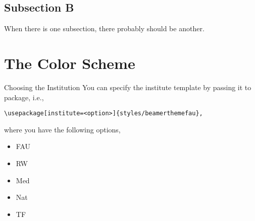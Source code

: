 \subsection{Subsection B}
\begin{frame}{\mbox{}}
When there is one subsection, there probably should be another.
\end{frame}
%
%
%
%
%
\section{The Color Scheme}
%
%
%
%
%
\begin{frame}[fragile]{Choosing the Institution}
You can specify the institute template by passing it to package, i.e.,
%
\begin{center}
\begin{verbatim}
\usepackage[institute=<option>]{styles/beamerthemefau},
\end{verbatim}
\end{center}
%
where you have the following options,
\begin{itemize}
\item FAU
\item RW
\item Med
\item Nat
\item TF
\end{itemize}
\end{frame}
%
%
%
%
%
